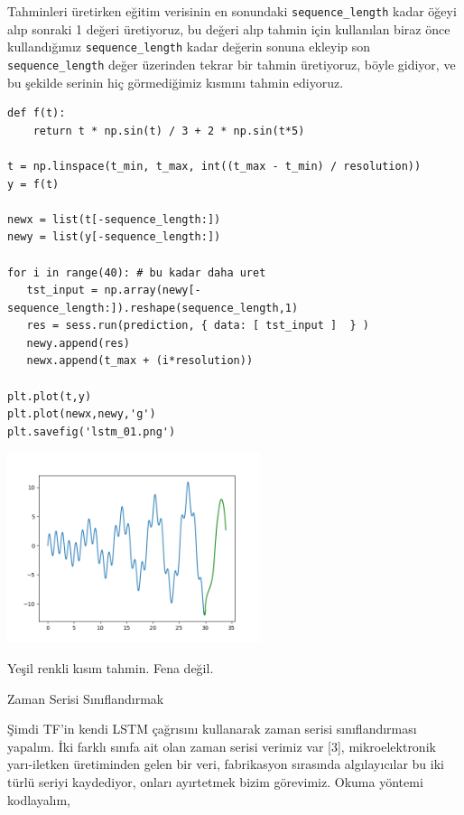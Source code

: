 \documentclass[12pt,fleqn]{article}\usepackage{../../common}
\begin{document}
Tahminleri üretirken eğitim verisinin en sonundaki \verb!sequence_length!
kadar öğeyi alıp sonraki 1 değeri üretiyoruz, bu değeri alıp tahmin için
kullanılan biraz önce kullandığımız \verb!sequence_length! kadar değerin
sonuna ekleyip son \verb!sequence_length! değer üzerinden tekrar bir
tahmin üretiyoruz, böyle gidiyor, ve bu şekilde serinin hiç görmediğimiz
kısmını tahmin ediyoruz.

\begin{verbatim}
def f(t):
    return t * np.sin(t) / 3 + 2 * np.sin(t*5)

t = np.linspace(t_min, t_max, int((t_max - t_min) / resolution))
y = f(t)

newx = list(t[-sequence_length:])
newy = list(y[-sequence_length:])

for i in range(40): # bu kadar daha uret
   tst_input = np.array(newy[-sequence_length:]).reshape(sequence_length,1)   
   res = sess.run(prediction, { data: [ tst_input ]  } )
   newy.append(res)
   newx.append(t_max + (i*resolution))

plt.plot(t,y)
plt.plot(newx,newy,'g')
plt.savefig('lstm_01.png')
\end{verbatim}

\includegraphics[width=20em]{lstm_01.png}

Yeşil renkli kısım tahmin. Fena değil.

Zaman Serisi Sınıflandırmak

Şimdi TF'in kendi LSTM çağrısını kullanarak zaman serisi sınıflandırması
yapalım. İki farklı sınıfa ait olan zaman serisi verimiz var [3],
mikroelektronik yarı-iletken üretiminden gelen bir veri, fabrikasyon
sırasında algılayıcılar bu iki türlü seriyi kaydediyor, onları ayırtetmek
bizim görevimiz. Okuma yöntemi kodlayalım,
\end{document}

